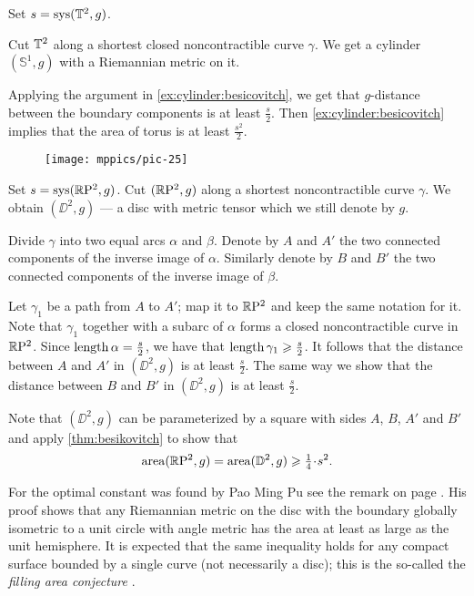 Set $s=\mathop{\rm sys}\nolimits(\mathbb{T}^2,g)$.

Cut $\mathbb{T}^2$ along a shortest closed noncontractible curve $\gamma$.
We get a cylinder $(\mathbb{S}^1,g)$ with a Riemannian metric on it.

Applying the argument in \ref{ex:cylinder:besicovitch}, we get that $g$-distance between the boundary components is at least $\tfrac s2$.
Then \ref{ex:cylinder:besicovitch} implies that the area of torus is at least $\tfrac{s^2}2$.

\begin{wrapfigure}{r}{44 mm}
\vskip-4mm
\centering
\texttt{[image: mppics/pic-25]}
\end{wrapfigure}

Set $s\z=\sys (\RP^2,g)$.
Cut $(\mathbb{R}\mathrm{P}^2,g)$ along a shortest noncontractible curve $\gamma$.
We obtain $(\DD^2,g)$ --- a disc with metric tensor which we still denote by $g$.

Divide $\gamma$ into two equal arcs $\alpha$ and $\beta$.
Denote by $A$ and $A'$ the two connected components of the inverse image of $\alpha$.
Similarly denote by $B$ and $B'$ the two connected components of the inverse image of $\beta$.

Let $\gamma_1$ be a path from $A$ to $A'$;
map it to $\mathbb{R}\mathrm{P}^2$ and keep the same notation for it.
Note that $\gamma_1$ together with a subarc of $\alpha$ forms a closed noncontractible curve in $\mathbb{R}\mathrm{P}^2$.
Since $\mathop{\rm length}\nolimits\alpha=\tfrac s2$, we have that $\mathop{\rm length}\nolimits\gamma_1\geqslant \tfrac s2$.
It follows that the distance between $A$ and $A'$ in $(\DD^2,g)$ is at least $\tfrac s2$.
The same way we show that the distance between $B$ and $B'$ in $(\DD^2,g)$ is at least $\tfrac s2$.

Note that $(\DD^2,g)$ can be parameterized by a square with sides $A$, $B$, $A'$ and $B'$ and apply \ref{thm:besikovitch} to show that 
\[\area(\RP^2,g)=\area(\DD^2,g)\ge \tfrac14\cdot s^2.\]

For the optimal constant was found by Pao Ming Pu see the remark on page \pageref{page:pu}.
His proof shows that any Riemannian metric on the disc with the boundary globally isometric to a unit circle with angle metric has the area at least as large as the unit hemisphere.
It is expected that the same inequality holds for any compact surface bounded by a single curve (not necessarily a disc);
this is the so-called the {}\emph{filling area conjecture} \cite[it is mentioned in 5.5.$\mathrm{B}'(\mathrm{e}')$ of][]{gromov-1983}.

